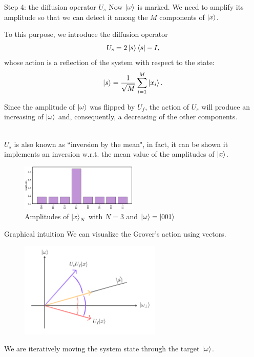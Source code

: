 \documentclass[aspectratio=169, 8pt, xcolor={svgnames}, hyperref={linkcolor=black}]{beamer}
\begin{document}
\begin{frame}{Step 4: the diffusion operator $U_s$}
Now $\ket{\omega}$ is marked. We need to amplify its amplitude so that we can
detect it among the $M$ components of $\ket{x}$. \pause

To this purpose, we introduce the diffusion operator
$$ U_s =  2 \ket{s}\bra{s} - I, $$
whose action is a reflection of the system with respect to the state:
$$ \ket{s} = \frac{1}{\sqrt{M}}\sum_{i=1}^{M} \ket{x_i}. $$ \pause

Since the amplitude of $\ket{\omega}$ was flipped by $U_f$, the action of $U_s$
will produce an increasing of $\ket{\omega}$ and, consequently, a decreasing of the
other components. \pause

\begin{multicols}{2}
\textit{\\}
$U_s$ is also known as \textcolor{carnelian}{``inversion by the mean"}, in fact, it can be shown
it implements an inversion w.r.t. the mean value of the amplitudes of $\ket{x}$.
\begin{figure}
   \includegraphics[width=0.5\textwidth]{figures/state3.png}
   \caption*{Amplitudes of $\ket{x}_N$ with $N=3$ and $\ket{\omega} = \ket{001}$}
\end{figure}
\end{multicols}
\end{frame}

\begin{frame}{Graphical intuition}
We can visualize the Grover's action using vectors.
\begin{figure}
   \includegraphics[width=0.6\textwidth]{figures/vectors.png}
\end{figure}
We are iteratively moving the system state through the target $\ket{\omega}$.
\end{frame}
\end{document}
